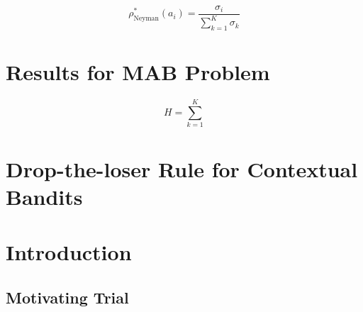 \documentclass[12pt,,letterpaper,twoside]{report}
\begin{document}
\[\rho^*_{\mathrm{Neyman}}(a_i) = \frac{\sigma_i}{\sum_{k = 1}^{K} \sigma_k}\]

\hypertarget{results-for-mab-problem}{%
\section{Results for MAB Problem}\label{results-for-mab-problem}}

\[H = \sum_{k = 1}^{K}\]

\hypertarget{drop-the-loser-rule-for-contextual-bandits}{%
\section{Drop-the-loser Rule for Contextual
Bandits}\label{drop-the-loser-rule-for-contextual-bandits}}

\hypertarget{introduction-1}{%
\section{Introduction}\label{introduction-1}}

\hypertarget{motivating-trial}{%
\subsection{Motivating Trial}\label{motivating-trial}}
\end{document}
